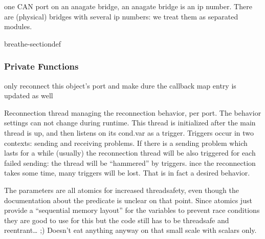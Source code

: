 \documentclass[a4paper,10pt,english]{sphinxmanual}
\begin{document}
\begin{fulllineitems}
%
\pysigstartmultiline
{}%
\pysigstopmultiline
\sphinxAtStartPar
one CAN port on an anagate bridge, an anagate bridge is an ip number. There are (physical) bridges with several ip numbers: we treat them as separated modules. 

\begin{sphinxuseclass}{breathe-sectiondef}\subsubsection*{Private Functions}


\begin{fulllineitems}
%
\pysigstartmultiline
{}%
\pysigstopmultiline
\sphinxAtStartPar
only reconnect this object’s port and make dure the callback map entry is updated as well 

\end{fulllineitems}



\begin{fulllineitems}
%
\pysigstartmultiline
{}%
\pysigstopmultiline
\sphinxAtStartPar
Reconnection thread managing the reconnection behavior, per port. The behavior settings can not change during runtime. This thread is initialized after the main thread is up, and then listens on its cond.var as a trigger. Triggers occur in two contexts: sending and receiving problems. If there is a sending problem which lasts for a while (usually) the reconnection thread will be also triggered for each failed sending: the thread will be “hammered” by triggers. ince the reconnection takes some time, many triggers will be lost. That is in fact a desired behavior.

\sphinxAtStartPar
The parameters are all atomics for increased thread\sphinxhyphen{}safety, even though the documentation about the predicate is unclear on that point. Since atomics just provide a “sequential memory layout” for the variables to prevent race conditions they are good to use for this but the code still has to be threadsafe and reentrant… ;\sphinxhyphen{}) Doesn’t eat anything anyway on that small scale with scalars only.


\end{fulllineitems}
\end{sphinxuseclass}
\end{fulllineitems}
\end{document}
